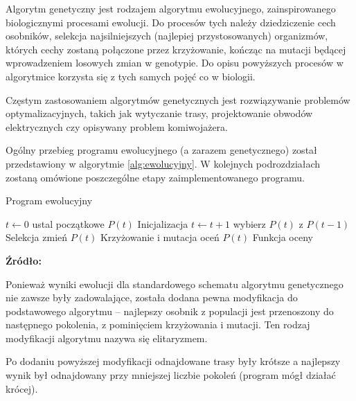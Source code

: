 Algorytm genetyczny jest rodzajem algorytmu ewolucyjnego, zainspirowanego biologicznymi procesami ewolucji\cite{genetyczne}. Do procesów tych należy dziedziczenie cech osobników, selekcja najsilniejszych (najlepiej przystosowanych) organizmów, których cechy zostaną połączone przez krzyżowanie, kończąc na mutacji będącej wprowadzeniem losowych zmian w genotypie. Do opisu powyższych procesów w algorytmice korzysta się z tych samych pojęć co w biologii.

Częstym zastosowaniem algorytmów genetycznych jest rozwiązywanie problemów optymalizacyjnych, takich jak wytyczanie trasy, projektowanie obwodów elektrycznych czy opisywany problem komiwojażera.

Ogólny przebieg programu ewolucyjnego (a zarazem genetycznego) został przedstawiony w algorytmie \ref{alg:ewolucyjny}. W kolejnych podrozdziałach zostaną omówione poszczególne etapy zaimplementowanego programu.

\begin{algorithm}
	\caption{Program ewolucyjny}\label{alg:ewolucyjny}
	\begin{algorithmic}[1]
		\State $t\gets 0$
		\State ustal początkowe $P(t)$ 	\Comment Inicjalizacja
			\State $t\gets t + 1$
			\State wybierz $P(t)$ z $P(t - 1)$ \Comment Selekcja
			\State zmień $P(t)$ \Comment Krzyżowanie i mutacja
			\State oceń $P(t)$ \Comment Funkcja oceny
		\EndWhile
		\EndProcedure
	\end{algorithmic}
\end{algorithm}
\begin{center}
	\textbf{Źródło:} \cite{genetyczne}
\end{center}

Ponieważ wyniki ewolucji dla standardowego schematu algorytmu genetycznego nie zawsze były zadowalające, została dodana pewna modyfikacja do podstawowego algorytmu -- najlepszy osobnik z populacji jest przenoszony do następnego pokolenia, z pominięciem krzyżowania i mutacji. Ten rodzaj modyfikacji algorytmu nazywa się elitaryzmem.

Po dodaniu powyższej modyfikacji odnajdowane trasy były krótsze a najlepszy wynik był odnajdowany przy mniejszej liczbie pokoleń (program mógł działać krócej).
